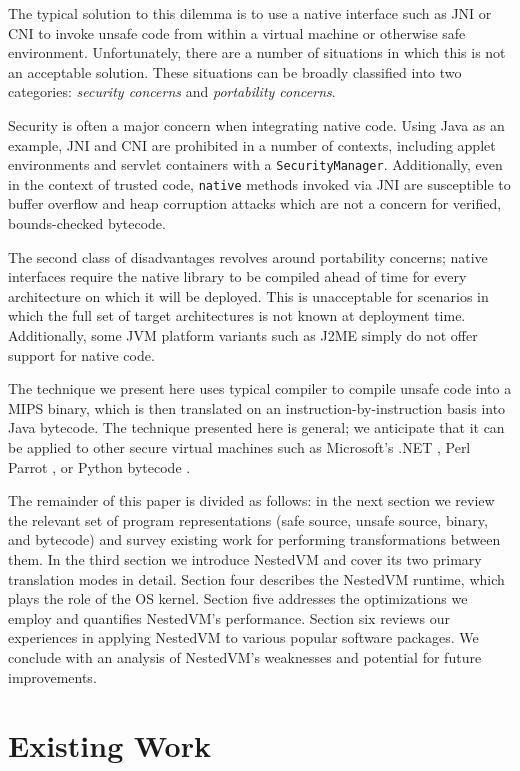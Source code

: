 \documentclass{acmconf}
\begin{document}
The typical solution to this dilemma is to use a native interface such
as JNI \cite{jni} or CNI \cite{cni} to invoke unsafe code from within a
virtual machine or otherwise safe environment.  Unfortunately, there
are a number of situations in which this is not an acceptable
solution.  These situations can be broadly classified into two
categories: {\it security concerns} and {\it portability concerns}.

Security is often a major concern when integrating native code.  Using
Java as an example, JNI and CNI are prohibited in a number of
contexts, including applet environments and servlet containers with a
{\tt SecurityManager}.  Additionally, even in the context of trusted
code, {\tt native} methods invoked via JNI are susceptible to buffer
overflow and heap corruption attacks which are not a concern for
verified, bounds-checked bytecode.

The second class of disadvantages revolves around portability
concerns; native interfaces require the native library to be compiled
ahead of time for every architecture on which it will be deployed.
This is unacceptable for scenarios in which the full set of target
architectures is not known at deployment time.  Additionally, some JVM
platform variants such as J2ME \cite{j2me} simply do not offer support
for native code.

The technique we present here uses typical compiler to compile unsafe
code into a MIPS binary, which is then translated on an
instruction-by-instruction basis into Java bytecode.  The technique
presented here is general; we anticipate that it can be applied to
other secure virtual machines such as Microsoft's .NET \cite{msil},
Perl Parrot \cite{parrot}, or Python bytecode \cite{python}.

The remainder of this paper is divided as follows: in the next section
we review the relevant set of program representations (safe source,
unsafe source, binary, and bytecode) and survey existing work for
performing transformations between them.  In the third section we
introduce NestedVM and cover its two primary translation modes in
detail.  Section four describes the NestedVM runtime, which plays the
role of the OS kernel.  Section five addresses the optimizations we
employ and quantifies NestedVM's performance.  Section six reviews our
experiences in applying NestedVM to various popular software packages.
We conclude with an analysis of NestedVM's weaknesses and potential
for future improvements.


\section{Existing Work}
\end{document}
